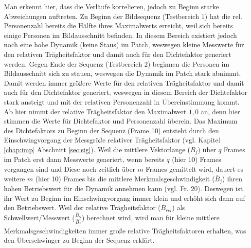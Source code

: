 Man erkennt hier, dass die Verläufe korrelieren, jedoch zu Beginn starke Abweichungen auftreten. Zu Beginn der Bildsequenz (Testbereich 1) hat die rel. Personenzahl bereits die Hälfte ihres Maximalwerts erreicht, weil sich bereits einige Personen im Bildausschnitt befinden. In diesem Bereich existiert jedoch noch eine hohe Dynamik (keine Staus) im Patch, weswegen kleine Messwerte für den relativen Trägheitsfaktor und damit auch für den Dichtefaktor generiert werden. Gegen Ende der Sequenz (Testbereich 2) beginnen die Personen im Bildausschnitt sich zu stauen, weswegen die Dynamik im Patch stark abnimmt. Damit werden immer größere Werte für den relativen Trägheitsfaktor und damit auch für den Dichtefaktor generiert, weswegen in diesem Bereich der Dichtefaktor stark ansteigt und mit der relativen Personenzahl in Übereinstimmung kommt. Ab hier nimmt der relative Trägheitsfaktor den Maximalwert $1,0$ an, denn hier stimmen die Werte für Dichtefaktor und Personenzahl überein. Das Maximum des Dichtefaktors zu Beginn der Sequenz (Frame 10) entsteht durch den Einschwingvorgang der Messgröße relativer Trägheitsfaktor (vgl. Kapitel \ref{chap:imp} Abschnitt \ref{sec:sig}).
\newpage
Weil die mittlere Vektorlänge ($B_j$) über $q$ Frames im Patch erst dann Messwerte generiert, wenn bereits $q$ (hier 10) Frames vergangen sind und Diese noch zeitlich über $m$ Frames gemittelt wird, dauert es weitere $m$ (hier 10) Frames bis die mittlere Merkmalsgeschwindigkeit ($\bar{B}_j$) ihren hohen Betriebswert für die Dynamik annehmen kann (vgl. Fr. 20). Deswegen ist ihr Wert zu Beginn im Einschwingvorgang immer klein und erhöht sich dann auf den Betriebswert. Weil der relative Trägheitsfaktor ($B_{rel}$) als Schwellwert/Messwert ($\frac{\bar{B}_S}{\bar{B}_j}$) berechnet wird, wird man für kleine mittlere Merkmalsgeschwindigkeiten immer große relative Trägheitsfaktoren erhalten, was den Überschwinger zu Beginn der Sequenz erklärt.

